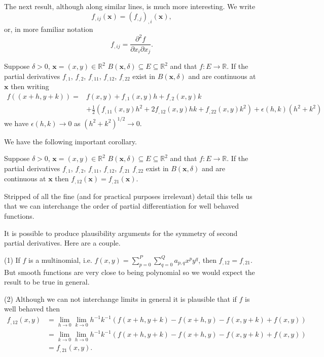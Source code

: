 The next result, although along similar lines, is
much more interesting. We write
\[f_{,ij}({\mathbf x})=(f_{,j})_{,i}({\mathbf x}),\]
or, in more familiar notation
\[f_{,ij}=\frac{\partial^{2}f}{\partial x_{i}\partial x_{j}}.\]
\begin{theorem}\label{2 Taylor}
Suppose $\delta>0$,
${\mathbf x}=(x,y)\in{\mathbb R}^{2}$
$B({\mathbf x},\delta)\subseteq  E\subseteq {\mathbb R}^{2}$
and that $f:E\rightarrow{\mathbb R}$. If  the partial
derivatives $f_{,1}$, $f_{,2}$, $f_{,11}$, $f_{,12}$,
$f_{,22}$ exist in $B({\mathbf x},\delta)$
and are continuous at ${\mathbf x}$ then writing
\begin{align*}
f((x+h,y+k))=&f(x,y)+f_{,1}(x,y)h+f_{,2}(x,y)k\\
&+\tfrac{1}{2}(f_{,11}(x,y)h^{2}+2f_{,12}(x,y)hk
+f_{,22}(x,y)k^{2})+\epsilon(h,k)(h^{2}+k^{2})
\end{align*}
we have $\epsilon(h,k)\rightarrow 0$ as
$(h^{2}+k^{2})^{1/2}\rightarrow 0$.
\end{theorem}
We have the following important corollary.
\begin{theorem}%
\label{Symmetry derivative}
Suppose $\delta>0$,
${\mathbf x}=(x,y)\in{\mathbb R}^{2}$
$B({\mathbf x},\delta)\subseteq  E\subseteq {\mathbb R}^{2}$
and that $f:E\rightarrow{\mathbb R}$. If  the partial
derivatives $f_{,1}$, $f_{,2}$, $f_{,11}$, $f_{,12}$, $f_{,21}$
$f_{,22}$ exist in $B({\mathbf x},\delta)$
and are continuous at ${\mathbf x}$ then 
$f_{,12}({\mathbf x})=f_{,21}({\mathbf x})$.
\end{theorem}
Stripped of all the fine (and for practical purposes
irrelevant) detail this tells us that we can  interchange
the order of partial differentiation for well behaved functions.

It is possible to produce plausibility arguments
for the symmetry of second partial derivatives.
Here are a couple.

(1) If $f$ is a multinomial, i.e.
$f(x,y)=\sum_{p=0}^{P}\sum_{q=0}^{Q}a_{p,q}x^{p}y^{q}$,
then $f_{,12}=f_{,21}$. But smooth functions are
very close to being polynomial so we would expect
the result to be true in general.

(2) Although we can not interchange limits in general
it is plausible that if $f$ is well behaved then
\begin{align*}
f_{,12}(x,y)&=\lim_{h\rightarrow 0}\lim_{k\rightarrow 0}
h^{-1}k^{-1}(f(x+h,y+k)-f(x+h,y)-f(x,y+k)+f(x,y))\\
&=\lim_{k\rightarrow 0}\lim_{h\rightarrow 0}
h^{-1}k^{-1}(f(x+h,y+k)-f(x+h,y)-f(x,y+k)+f(x,y))\\
&=f_{,21}(x,y).
\end{align*}

